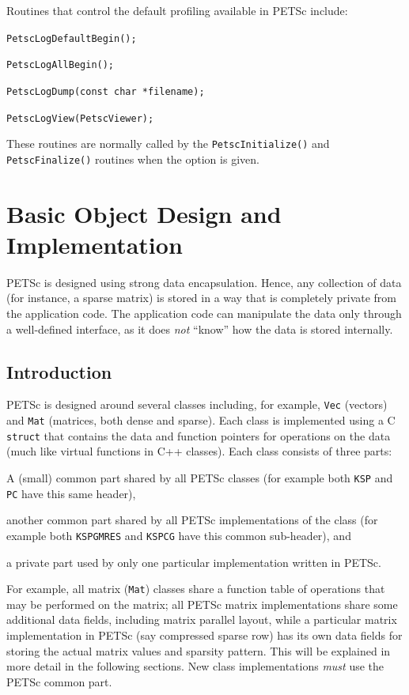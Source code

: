 Routines that control the default profiling available in PETSc include:
\begin{tightitemize}
  \item\lstinline{PetscLogDefaultBegin();}
  \item\lstinline{PetscLogAllBegin();}
  \item\lstinline{PetscLogDump(const char *filename);}
  \item\lstinline{PetscLogView(PetscViewer);}
\end{tightitemize}
These routines are normally called by the \lstinline{PetscInitialize()}
and \lstinline{PetscFinalize()} routines when the option
 is given.

\chapter{Basic Object Design and Implementation}
\label{chapter:design}

PETSc is designed using strong data encapsulation.  Hence,
any collection of data (for instance, a sparse matrix) is stored in
a way that is completely private from the application code. The application
code can manipulate the data only through a well-defined interface, as it
does {\em not} ``know'' how the data is stored internally.

\section{Introduction}

PETSc is designed around several classes including, for example, \lstinline{Vec} (vectors) and
\lstinline{Mat} (matrices, both dense and sparse). Each class is
implemented using a C \lstinline{struct} that contains the data and function pointers
for operations on the data (much like virtual functions in C++ classes).
Each class consists of three parts:
\begin{tightenumerate}
  \item A (small) common part shared by all PETSc classes (for example both \lstinline{KSP} and \lstinline{PC} have this same header),
  \item another common part shared by all PETSc implementations of the class (for example both \lstinline{KSPGMRES} and \lstinline{KSPCG} have this common sub-header), and
  \item a private part used by only one particular implementation written in PETSc.
\end{tightenumerate}
For example, all matrix (\lstinline{Mat}) classes share a function table of operations that
may be performed on the matrix; all PETSc matrix implementations share some additional
data fields, including matrix parallel layout, while a particular matrix implementation in PETSc
(say compressed sparse row) has its own data fields for storing the actual
matrix values and sparsity pattern. This will be explained in more detail
in the following sections. New class implementations {\em must}
use the PETSc common part.


